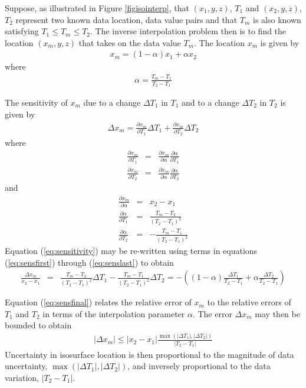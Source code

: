 \documentclass[11pt,twoside]{book}
\newcommand{\pxtone}{ \frac{\partial x_m}{\partial T_1} }
\newcommand{\pxttwo}{ \frac{\partial x_m}{\partial T_2} }
\newcommand{\pxalpha}{ \frac{\partial x_m}{\partial \alpha} }
\newcommand{\palphatone}{ \frac{\partial \alpha}{\partial T_1} }
\newcommand{\palphattwo}{ \frac{\partial \alpha}{\partial T_2} }
\begin{document}
Suppose, as illustrated in Figure \ref{figisointerp}, that
$(x_1,y,z)$, $T_1$ and $(x_2,y,z)$, $T_2$ represent two known data
location, data value pairs and that $T_m$ is also known satisfying
$T_1\le T_m \le T_2$.  The inverse interpolation problem then is
to find the location $(x_m,y,z)$ that takes on the data value
$T_m$.  The location $x_m$ is given by
\begin{eqnarray*}
x_m=(1-\alpha)x_1+\alpha x_2
\end{eqnarray*}
where
\begin{eqnarray*}
\alpha=\frac{T_m-T_1}{T_2-T_1}
\end{eqnarray*}

\noindent The sensitivity of $x_m$ due to a change $\Delta T_1$ in $T_1$ and to a change $\Delta T_2$ in $T_2$ is given by
\begin{eqnarray}
\Delta x_m= \pxtone \Delta T_1 + \pxttwo \Delta T_2
\label{eq:sensitivity}
\end{eqnarray}
where
\begin{eqnarray}
\pxtone&=&\pxalpha\palphatone \label{eq:sensfirst}\\
\pxttwo&=&\pxalpha\palphattwo
\end{eqnarray}
and
\begin{eqnarray}
\pxalpha&=&x_2-x_1\\
\palphatone&=&\frac{T_m-T_2}{(T_2-T_1)^2}\\
\palphattwo&=&-\frac{T_m-T_1}{(T_2-T_1)^2}
\label{eq:senslast}
\end{eqnarray}
Equation (\ref{eq:sensitivity}) may be re-written using terms in equations (\ref{eq:sensfirst}) through (\ref{eq:senslast}) to obtain
\begin{eqnarray}
\frac{\Delta x_m}{x_2-x_1}&=&\frac{T_m-T_2}{(T_2-T_1)^2}\Delta T_1-
\frac{T_m-T_1}{(T_2-T_1)^2}\Delta T_2
=-\left(
(1-\alpha)\frac{\Delta T_1}{T_2-T_1}+
\alpha\frac{\Delta T_2}{T_2-T_1}\right)
\label{eq:sensfinal}
\end{eqnarray}

\noindent Equation (\ref{eq:sensfinal}) relates the relative error of $x_m$
to the relative errors of $T_1$ and $T_2$ in terms of the interpolation parameter $\alpha$.
The error $\Delta x_m$ may then be bounded to obtain
\begin{eqnarray}
|\Delta x_m|\le
|x_2-x_1|\frac{\max(|\Delta T_1|,|\Delta T_2|)}{|T_2-T_1|}
\end{eqnarray}
\noindent Uncertainty in isosurface location is then proportional to the magnitude of data uncertainty, $\max(|\Delta T_1|,|\Delta T_2|)$, and inversely proportional to the data variation, $|T_2-T_1|$.
\end{document}
